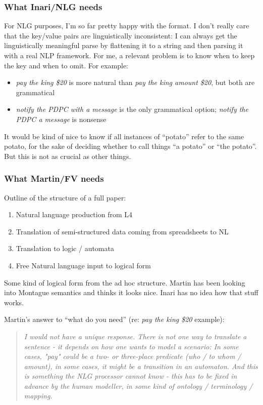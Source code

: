 \documentclass[runningheads]{llncs}
\begin{document}
\subsubsection{What Inari/NLG needs}

For NLG purposes, I'm so far pretty happy with the format. I don't really care that the key/value pairs are linguistically inconsistent: I can always get the linguistically meaningful parse by flattening it to a string and then parsing it with a real NLP framework. For me, a relevant problem is to know when to keep the key and when to omit. For example:

\begin{itemize}
    \item \textit{pay the king \$20} is more natural than \textit{pay the king amount \$20}, but both are grammatical
    \item \textit{notify the PDPC with a message} is the only grammatical option; \textit{notify the PDPC a message} is nonsense
\end{itemize}

It would be kind of nice to know if all instances of ``potato'' refer to the same potato, for the sake of deciding whether to call things  ``a potato'' or ``the potato''. But this is not as crucial as other things.

\subsubsection{What Martin/FV needs}


Outline of the structure of a full paper:
\begin{enumerate}
    \item Natural language production from L4
    \item Translation of semi-structured data coming from spreadsheets to NL
    \item Translation to logic / automata 
    \item Free Natural language input to logical form
\end{enumerate}



Some kind of logical form from the ad hoc structure. Martin has been looking into Montague semantics and thinks it looks nice. Inari has no idea how that stuff works.

Martin's answer to ``what do you need'' (re: \textit{pay the king \$20} example):
\begin{quote}
{
\it
I would not have a unique response. There is not one way to translate a sentence - it depends on how one wants to model a scenario: In some cases, "pay" could be a two- or three-place predicate (who / to whom / amount), in some cases, it might be a transition in an automaton. And this is something the NLG processor cannot know - this has to be fixed in advance by the human modeller, in some kind of ontology / terminology / mapping.
}
    \end{quote}
\end{document}

